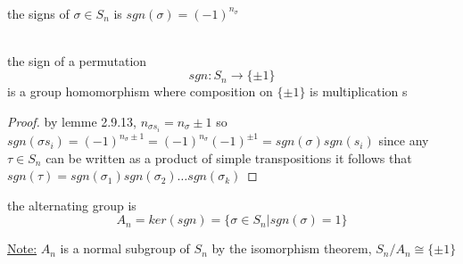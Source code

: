 \documentclass{article}
\begin{document}
\begin{definition}[2.9.15]
    \leavevmode \\ 
    the signs of $\sigma \in S_n$ is $sgn(\sigma) = (-1)^{n_{\sigma}}$
\end{definition}


\begin{proposition}[2.9.16 ] \leavevmode \\ 
    the sign of a permutation $$sgn: S_n \rightarrow \{\pm 1\}$$ is a group homomorphism where composition on $\{\pm 1\}$ is multiplication s
\end{proposition}

\begin{proof}
    by lemme 2.9.13, $n_{\sigma s_i} = n_{\sigma} \pm1 $ so $sgn(\sigma s_i) = (-1)^{n_{\sigma} \pm 1} = (-1)^{n_{\sigma}} (-1)^{\pm 1} = sgn(\sigma) sgn(s_i)$
    since any $\tau \in S_n$ can be written as a product of simple transpositions it follows that $sgn(\tau) = sgn(\sigma_1) sgn(\sigma_2) \dots sgn(\sigma_k)$
\end{proof}

\begin{definition}
    the alternating group is $$A_n = ker(sgn) = \{\sigma \in S_n | sgn(\sigma ) = 1\}$$
\end{definition}

\underline{Note:} $A_n $ is a normal subgroup of $S_n$ by the isomorphism theorem, $S_n / A_n \cong \{\pm 1\}$
 
\end{document}
